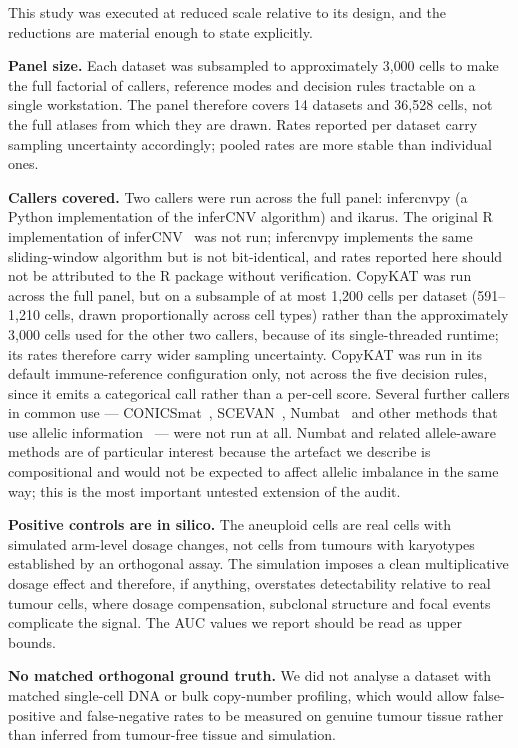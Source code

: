 \documentclass[11pt]{article}
\begin{document}
This study was executed at reduced scale relative to its design, and the
reductions are material enough to state explicitly.

\textbf{Panel size.} Each dataset was subsampled to approximately 3{,}000
cells to make the full factorial of callers, reference modes and decision
rules tractable on a single workstation. The panel therefore covers 14
datasets and 36{,}528 cells, not the full atlases from which they are drawn.
Rates reported per dataset carry sampling uncertainty accordingly; pooled
rates are more stable than individual ones.

\textbf{Callers covered.} Two callers were run across the full panel:
infercnvpy (a Python implementation of the inferCNV algorithm) and ikarus.
The original R implementation of inferCNV~\cite{infercnv} was not run;
infercnvpy implements
the same sliding-window algorithm but is not bit-identical, and rates
reported here should not be attributed to the R package without verification.
CopyKAT was run across the full panel, but on a subsample of at most 1{,}200
cells per dataset (591--1{,}210 cells, drawn proportionally across cell
types) rather than the approximately 3{,}000 cells used for the other two
callers, because of its single-threaded runtime; its rates therefore carry
wider sampling uncertainty. CopyKAT was run in its default immune-reference
configuration only, not across the five decision rules, since it emits a
categorical call rather than a per-cell score. Several further callers in
common use --- CONICSmat~\cite{conics}, SCEVAN~\cite{scevan},
Numbat~\cite{numbat} and other methods that use allelic
information~\cite{casper,honeybadger} --- were not run at all. Numbat and related allele-aware methods are of particular interest
because the artefact we describe is compositional and would not be expected
to affect allelic imbalance in the same way; this is the most important
untested extension of the audit.

\textbf{Positive controls are in silico.} The aneuploid cells are real cells
with simulated arm-level dosage changes, not cells from tumours with
karyotypes established by an orthogonal assay. The simulation imposes a clean
multiplicative dosage effect and therefore, if anything, overstates
detectability relative to real tumour cells, where dosage compensation,
subclonal structure and focal events complicate the signal. The AUC values we
report should be read as upper bounds.

\textbf{No matched orthogonal ground truth.} We did not analyse a dataset
with matched single-cell DNA or bulk copy-number profiling, which would allow
false-positive and false-negative rates to be measured on genuine tumour
tissue rather than inferred from tumour-free tissue and simulation.
\end{document}
